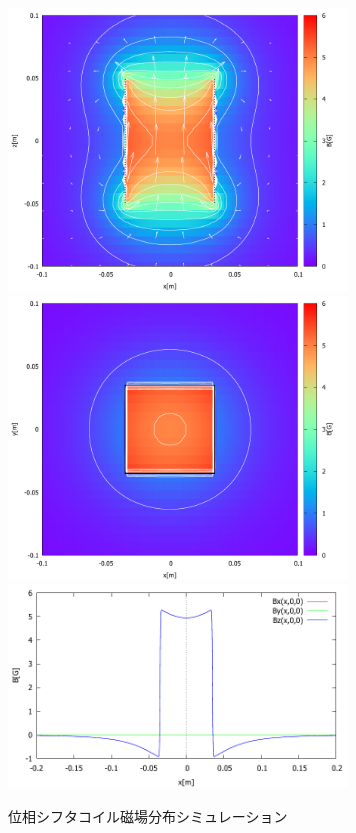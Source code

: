 \begin{figure}[H]
\begin{center}
\includegraphics[width=9cm]{analysis/B/coil11_image1.pdf}
\vspace{-1mm}
\vspace{-3mm}
\includegraphics[width=9cm]{analysis/B/coil11_image2.pdf}
\vspace{-1mm}
\vspace{-3mm}
\includegraphics[width=9cm]{analysis/B/coil11_danmen1.pdf}
\vspace{-1mm}
\vspace{-3mm}
\end{center}
\caption{位相シフタコイル磁場分布シミュレーション} \label{analysis_fig_PhaseShifterSimulation}
\end{figure}

